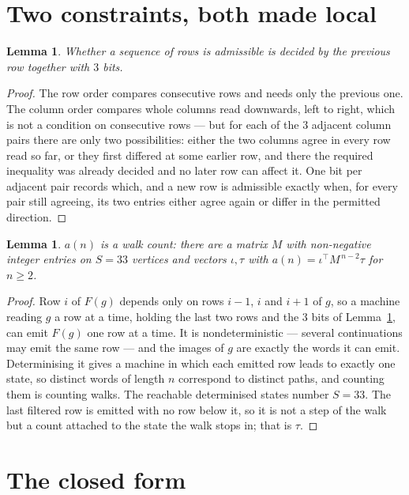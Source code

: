 \documentclass[11pt,a4paper]{article}
\theoremstyle{plain}
\newtheorem{lemma}[theorem]{Lemma}
\theoremstyle{definition}
\begin{document}
\section{Two constraints, both made local}

\begin{lemma}\label{lem:local}
Whether a sequence of rows is admissible is decided by the previous row together with
$3$ bits.
\end{lemma}

\begin{proof}
The row order compares consecutive rows and needs only the previous one. The column order
compares whole columns read downwards, left to right, which is not a condition on consecutive
rows --- but for each of the $3$ adjacent column pairs there are only two possibilities:
either the two columns agree in every row read so far, or they first differed at some earlier
row, and there the required inequality was already decided and no later row can affect it. One
bit per adjacent pair records which, and a new row is admissible exactly when, for every pair
still agreeing, its two entries either agree again or differ in the permitted direction.
\end{proof}

\begin{lemma}\label{lem:det}
$a(n)$ is a walk count: there are a matrix $M$ with non-negative integer entries on $S=33$
vertices and vectors $\iota,\tau$ with $a(n)=\iota^{\!\top}M^{\,n-2}\tau$ for $n\ge2$.
\end{lemma}

\begin{proof}
Row $i$ of $F(g)$ depends only on rows $i-1$, $i$ and $i+1$ of $g$, so a machine reading $g$ a
row at a time, holding the last two rows and the $3$ bits of Lemma~\ref{lem:local}, can
emit $F(g)$ one row at a time. It is nondeterministic --- several continuations may emit the
same row --- and the images of $g$ are exactly the words it can emit. Determinising it gives a
machine in which each emitted row leads to exactly one state, so distinct words of length $n$
correspond to distinct paths, and counting them is counting walks. The reachable determinised
states number $S=33$. The last filtered row is emitted with no row below it, so it is not a
step of the walk but a count attached to the state the walk stops in; that is $\tau$.
\end{proof}

\section{The closed form}
\end{document}
